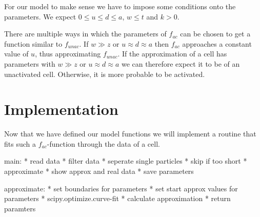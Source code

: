 For our model to make sense we have to impose some conditions onto the parameters. We expect $0 \leq u \leq d \leq a$, $w \leq t$ and $k > 0$.

There are multiple ways in which the parameters of $f_{ac}$ can be chosen to get a function similar to $f_{unac}$. If $w \gg z$ or $u \approx d \approx a$ then $f_{ac}$ approaches a constant value of $u$, thus approximating $f_{unac}$. If the approximation of a cell has parameters with $w \gg z$ or $u \approx d \approx a$ we can therefore expect it to be of an unactivated cell. Otherwise, it is more probable to be activated.

\section{Implementation}

Now that we have defined our model functions we will implement a routine that fits such a $f_{ac}$-function through the data of a cell.

main:
* read data
* filter data
* seperate single particles
* skip if too short
* approximate
* show approx and real data
* save parameters

approximate:
* set boundaries for parameters
* set start approx values for parameters
* scipy.optimize.curve-fit
* calculate approximation
* return paramters
